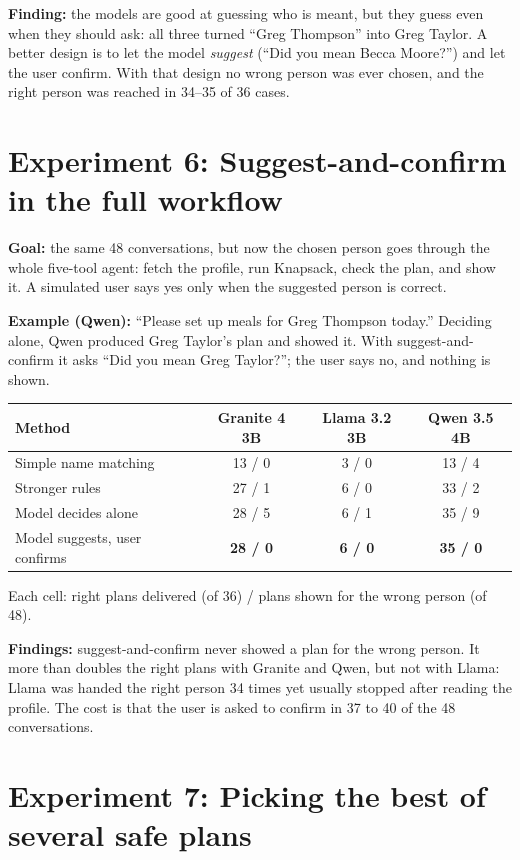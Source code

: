 \documentclass[11pt]{article}
\begin{document}
\textbf{Finding:} the models are good at guessing who is meant, but they guess
even when they should ask: all three turned ``Greg Thompson'' into Greg Taylor.
A better design is to let the model \emph{suggest} (``Did you mean Becca
Moore?'') and let the user confirm. With that design no wrong person was ever
chosen, and the right person was reached in 34--35 of 36 cases.

\section{Experiment 6: Suggest-and-confirm in the full workflow}

\textbf{Goal:} the same 48 conversations, but now the chosen person goes through
the whole five-tool agent: fetch the profile, run Knapsack, check the plan, and
show it. A simulated user says yes only when the suggested person is correct.

\textbf{Example (Qwen):} ``Please set up meals for Greg Thompson today.'' Deciding
alone, Qwen produced Greg Taylor's plan and showed it. With suggest-and-confirm it
asks ``Did you mean Greg Taylor?''; the user says no, and nothing is shown.

{\small
\begin{center}
\begin{tabular}{@{}lccc@{}}
\toprule
Method & Granite 4 3B & Llama 3.2 3B & Qwen 3.5 4B \\
\midrule
Simple name matching & 13 / 0 & 3 / 0 & 13 / 4 \\
Stronger rules & 27 / 1 & 6 / 0 & 33 / 2 \\
Model decides alone & 28 / 5 & 6 / 1 & 35 / 9 \\
Model suggests, user confirms & \textbf{28 / 0} & \textbf{6 / 0} & \textbf{35 / 0} \\
\bottomrule
\end{tabular}

Each cell: right plans delivered (of 36) / plans shown for the wrong person (of 48).
\end{center}}

\textbf{Findings:} suggest-and-confirm never showed a plan for the wrong person.
It more than doubles the right plans with Granite and Qwen, but not with Llama:
Llama was handed the right person 34 times yet usually stopped after reading the
profile. The cost is that the user is asked to confirm in 37 to 40 of the 48
conversations.

\section{Experiment 7: Picking the best of several safe plans}
\end{document}
